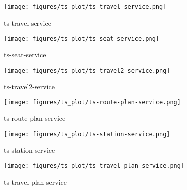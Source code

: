 \begin{appendices}
  \begin{figure}[htp]
    \centering
    \texttt{[image: figures/ts\_plot/ts-travel-service.png]}
    \caption{ts-travel-service}
  \end{figure}
    
    

  \begin{figure}[htp]
    \centering
    \texttt{[image: figures/ts\_plot/ts-seat-service.png]}
    \caption{ts-seat-service}
  \end{figure}
    

  \begin{figure}[htp]
    \centering
    \texttt{[image: figures/ts\_plot/ts-travel2-service.png]}
    \caption{ts-travel2-service}
  \end{figure}
    

  \begin{figure}[htp]
    \centering
    \texttt{[image: figures/ts\_plot/ts-route-plan-service.png]}
    \caption{ts-route-plan-service}
  \end{figure}
    

  \begin{figure}[htp]
    \centering
    \texttt{[image: figures/ts\_plot/ts-station-service.png]}
    \caption{ts-station-service}
  \end{figure}
    

  \begin{figure}[htp]
    \centering
    \texttt{[image: figures/ts\_plot/ts-travel-plan-service.png]}
    \caption{ts-travel-plan-service}
  \end{figure}

\end{appendices}
